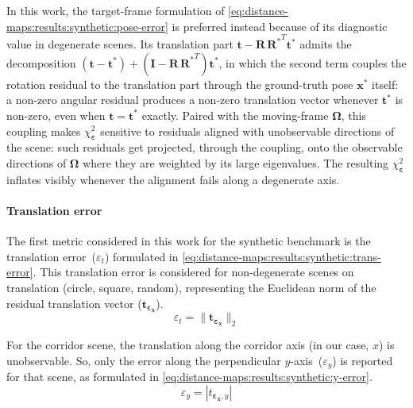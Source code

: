 In this work, the target-frame formulation of
\eqref{eq:distance-maps:results:synthetic:pose-error} is preferred instead
because of its diagnostic value in degenerate scenes. Its translation part
$\mathbf{t} - \mathbf{R}\,{\mathbf{R}^*}^T\mathbf{t}^*$ admits the
decomposition $(\mathbf{t}-\mathbf{t}^*) +
(\mathbf{I}-\mathbf{R}\,{\mathbf{R}^*}^T)\mathbf{t}^*$, in which the
second term couples the rotation residual to the translation part through
the ground-truth pose $\mathbf{x}^*$ itself: a non-zero angular residual
produces a non-zero translation vector whenever $\mathbf{t}^*$ is non-zero,
even when $\mathbf{t}=\mathbf{t}^*$ exactly. Paired with the moving-frame
$\boldsymbol{\Omega}$, this coupling makes
$\chi^2_{\boldsymbol{\varepsilon}}$ sensitive to residuals aligned with
unobservable directions of the scene: such residuals get projected,
through the coupling, onto the observable directions of
$\boldsymbol{\Omega}$ where they are weighted by its large eigenvalues.
The resulting $\chi^2_{\boldsymbol{\varepsilon}}$ inflates visibly whenever
the alignment fails along a degenerate axis.

\paragraph{Translation error}
The first metric considered in this work for the synthetic benchmark is
the translation error~($\varepsilon_t$) formulated in
\eqref{eq:distance-maps:results:synthetic:trans-error}.
This translation error is considered for non-degenerate scenes on translation
(circle, square, random), representing the Euclidean norm of the
residual translation vector ($\mathbf{t}_{\boldsymbol{\varepsilon}_\mathbf{x}}$).
\begin{equation}
\label{eq:distance-maps:results:synthetic:trans-error}
\varepsilon_t = \|\mathbf{t}_{\boldsymbol{\varepsilon}_\mathbf{x}}\|_2
\end{equation}

For the corridor scene, the translation along the corridor axis (in our case,
$x$) is unobservable. So, only the error along the perpendicular
$y$-axis~($\varepsilon_y$) is reported for that scene, as formulated in
\eqref{eq:distance-maps:results:synthetic:y-error}.
\begin{equation}
\label{eq:distance-maps:results:synthetic:y-error}
\varepsilon_y = |t_{\boldsymbol{\varepsilon}_\mathbf{x},y}|
\end{equation}

